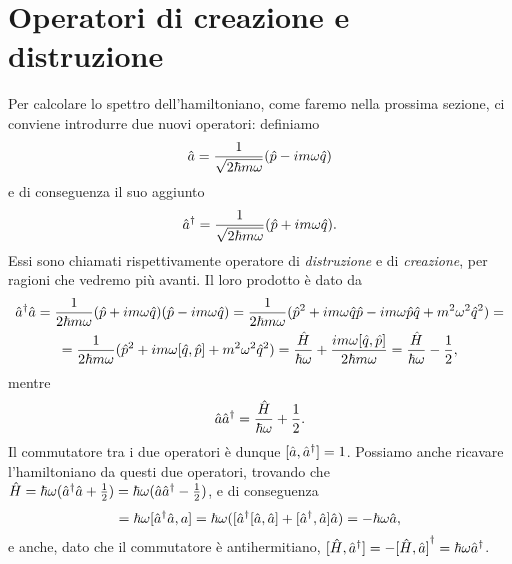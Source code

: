 \section{Operatori di creazione e distruzione}
Per calcolare lo spettro dell'hamiltoniano, come faremo nella prossima sezione, ci conviene introdurre due nuovi operatori: definiamo
\begin{equation}
	\hat{a}=\frac1{\sqrt{2\hbar m\omega}}(\hat{p}-im\omega\hat{q})
	\label{eq:operatore-distruzione}
\end{equation}
e di conseguenza il suo aggiunto
\begin{equation}
	{\hat{a}}^\dagger=\frac1{\sqrt{2\hbar m\omega}}(\hat{p}+im\omega\hat{q}).
	\label{eq:operatore-creazione}
\end{equation}
Essi sono chiamati rispettivamente operatore di \emph{distruzione} e di \emph{creazione}, per ragioni che vedremo più avanti.
Il loro prodotto è dato da
\begin{multline}
	{\hat{a}}^\dagger\hat{a}=\frac1{2\hbar m\omega}(\hat{p}+im\omega\hat{q})(\hat{p}-im\omega\hat{q})=\frac1{2\hbar m\omega}(\hat{p}^2+im\omega\hat{q}\hat{p}-im\omega\hat{p}\hat{q}+m^2\omega^2\hat{q}^2)=\\=\frac1{2\hbar m\omega}(\hat{p}^2+im\omega[\hat{q},\hat{p}]+m^2\omega^2\hat{q}^2)=\frac{\hat{H}}{\hbar\omega}+\frac{im\omega[\hat{q},\hat{p}]}{2\hbar m\omega}=\frac{\hat{H}}{\hbar\omega}-\frac12,
\end{multline}
mentre
\begin{equation}
	\hat{a}{\hat{a}}^\dagger=\frac{\hat{H}}{\hbar\omega}+\frac12.
\end{equation}
Il commutatore tra i due operatori è dunque $[\hat{a},{\hat{a}}^\dagger]=1$.
Possiamo anche ricavare l'hamiltoniano da questi due operatori, trovando che $\hat{H}=\hbar\omega({\hat{a}}^\dagger\hat{a}+\frac12)=\hbar\omega(\hat{a}{\hat{a}}^\dagger-\frac12)$, e di conseguenza
\begin{equation}
	[\op H,\op a]=\hbar\omega[\adj{\op a}\op a, a]=\hbar\omega([\adj{\op a}[\op a,\op a]+[\adj{\op a},\op a]\op a)=-\hbar\omega\op a,
\end{equation}
e anche, dato che il commutatore è antihermitiano, $[\hat{H},{\hat{a}}^\dagger]=-{[\hat{H},\hat{a}]}^\dagger=\hbar\omega{\hat{a}}^\dagger$.

